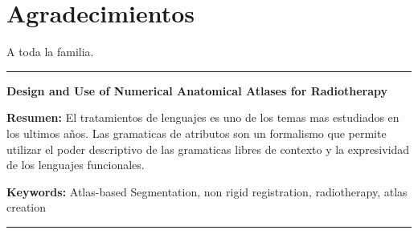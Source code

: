 \documentclass[a4paper,11pt,twoside]{ThesisStyle}
\begin{document}


\dominitoc


\cleardoublepage

\section*{Agradecimientos}

 A toda la familia.

\tableofcontents

\mainmatter

% 
\appendix







\cleardoublepage
\begin{vcenterpage}
\noindent\rule[2pt]{\textwidth}{0.5pt}
\begin{center}
{\large\textbf{Design and Use of Numerical Anatomical Atlases for Radiotherapy\\}}
\end{center}
{\large\textbf{Resumen:}}
El tratamientos de lenguajes es uno de los temas mas estudiados en los ultimos años.
Las gramaticas de atributos son un formalismo que permite utilizar el poder descriptivo de las gramaticas libres de contexto y la expresividad de los lenguajes funcionales. 

{\large\textbf{Keywords:}}
Atlas-based Segmentation, non rigid registration, radiotherapy, atlas creation
\\
\noindent\rule[2pt]{\textwidth}{0.5pt}
\end{vcenterpage}
\end{document}
